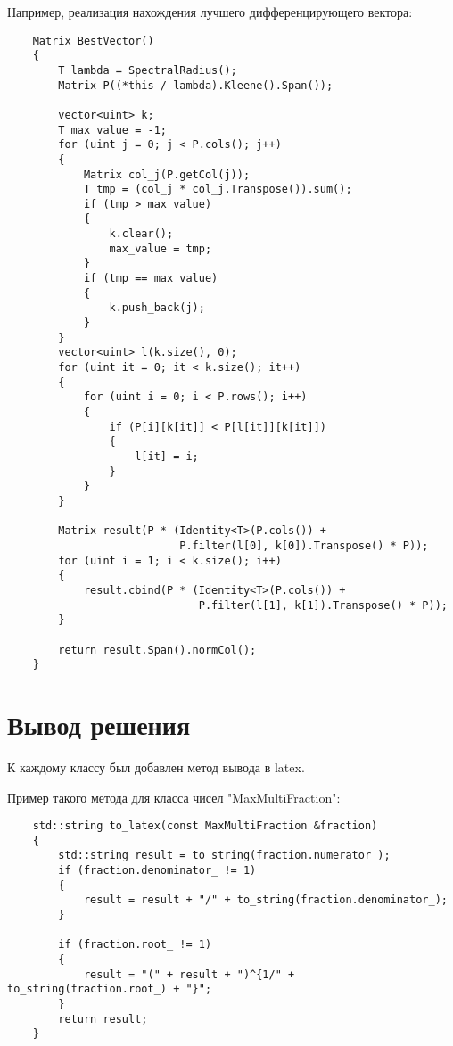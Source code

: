 \documentclass[specialist, substylefile = spbureport.rtx,
    subf,href,colorlinks=true, 12pt]{disser}
\begin{document}
    Например, реализация нахождения лучшего дифференцирующего вектора:
    \begin{lstlisting}
    Matrix BestVector()
    {
        T lambda = SpectralRadius();
        Matrix P((*this / lambda).Kleene().Span());

        vector<uint> k;
        T max_value = -1;
        for (uint j = 0; j < P.cols(); j++)
        {
            Matrix col_j(P.getCol(j));
            T tmp = (col_j * col_j.Transpose()).sum();
            if (tmp > max_value)
            {
                k.clear();
                max_value = tmp;
            }
            if (tmp == max_value)
            {
                k.push_back(j);
            }
        }
        vector<uint> l(k.size(), 0);
        for (uint it = 0; it < k.size(); it++)
        {
            for (uint i = 0; i < P.rows(); i++)
            {
                if (P[i][k[it]] < P[l[it]][k[it]])
                {
                    l[it] = i;
                }
            }
        }

        Matrix result(P * (Identity<T>(P.cols()) +
                           P.filter(l[0], k[0]).Transpose() * P));
        for (uint i = 1; i < k.size(); i++)
        {
            result.cbind(P * (Identity<T>(P.cols()) +
                              P.filter(l[1], k[1]).Transpose() * P));
        }

        return result.Span().normCol();
    }
    \end{lstlisting}

    \section{Вывод решения}
    К каждому классу был добавлен метод вывода в latex.
    
    Пример такого метода для класса чисел "MaxMultiFraction":

    \begin{lstlisting}
    std::string to_latex(const MaxMultiFraction &fraction)
    {
        std::string result = to_string(fraction.numerator_);
        if (fraction.denominator_ != 1)
        {
            result = result + "/" + to_string(fraction.denominator_);
        }

        if (fraction.root_ != 1)
        {
            result = "(" + result + ")^{1/" + to_string(fraction.root_) + "}";
        }
        return result;
    }
    \end{lstlisting}
    
\end{document}
